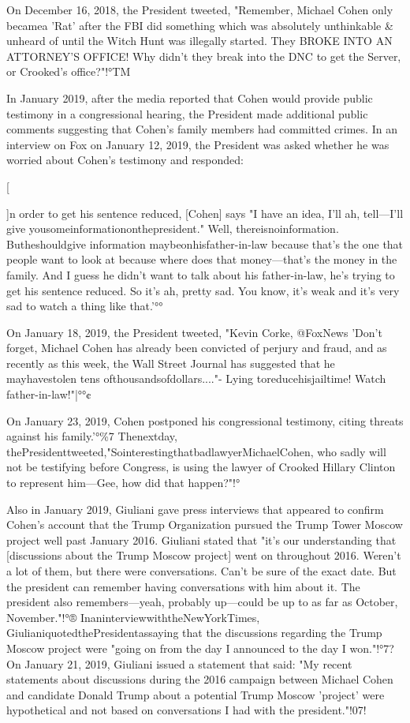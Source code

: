 On December 16, 2018, the President tweeted, "Remember, Michael Cohen only becamea 'Rat' after the FBI did something which was absolutely unthinkable \& unheard of until the Witch Hunt was illegally started.
They BROKE INTO AN ATTORNEY'S OFFICE!
Why didn't they break into the DNC to get the Server, or Crooked's office?"!°TM

In January 2019, after the media reported that Cohen would provide public testimony in a congressional hearing, the President made additional public comments suggesting that Cohen's family members had committed crimes.
In an interview on Fox on January 12, 2019, the President was asked whether he was worried about Cohen's testimony and responded:

[{]n order to get his sentence reduced, [Cohen] says "I have an idea, I'll ah, tell—I'll give yousomeinformationonthepresident."
Well, thereisnoinformation.
Butheshouldgive information maybeonhisfather-in-law because that's the one that people want to look at because where does that money—that's the money in the family.
And I guess he didn't want to talk about his father-in-law, he's trying to get his sentence reduced.
So it's ah, pretty sad.
You know, it's weak and it's very sad to watch a thing like that.'°°

On January 18, 2019, the President tweeted, "Kevin Corke, @FoxNews 'Don't forget, Michael Cohen has already been convicted of perjury and fraud, and as recently as this week, the Wall Street Journal has suggested that he mayhavestolen tens ofthousandsofdollars...."- Lying toreducehisjailtime! Watch father-in-law!"|°°¢

On January 23, 2019, Cohen postponed his congressional testimony, citing threats against his family.'°\%7
Thenextday, thePresidenttweeted,"SointerestingthatbadlawyerMichaelCohen, who sadly will not be testifying before Congress, is using the lawyer of Crooked Hillary Clinton to represent him—Gee, how did that happen?"!°%

Also in January 2019, Giuliani gave press interviews that appeared to confirm Cohen's account that the Trump Organization pursued the Trump Tower Moscow project well past January 2016.
Giuliani stated that "it's our understanding that [discussions about the Trump Moscow project] went on throughout 2016.
Weren't a lot of them, but there were conversations.
Can't be sure of the exact date.
But the president can remember having conversations with him about it.
The president also remembers—yeah, probably up—could be up to as far as October, November."!°®
InaninterviewwiththeNewYorkTimes, GiulianiquotedthePresidentassaying that the discussions regarding the Trump Moscow project were "going on from the day I announced to the day I won."!°7?
On January 21, 2019, Giuliani issued a statement that said: "My recent statements about discussions during the 2016 campaign between Michael Cohen and candidate Donald Trump about a potential Trump Moscow 'project' were hypothetical and not based on conversations I had with the president."!07!

}
